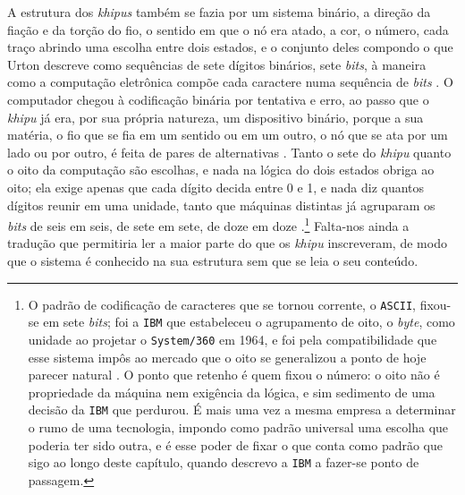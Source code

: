 A estrutura dos \textit{khipus} também se fazia por um sistema binário, a direção da fiação e da torção do fio, o sentido em que o nó era atado, a cor, o número, cada traço abrindo uma escolha entre dois estados, e o conjunto deles compondo o que Urton descreve como sequências de sete dígitos binários, sete \textit{bits}, à maneira como a computação eletrônica compõe cada caractere numa sequência de \textit{bits} \parencite[pp.~1--2, 109--117]{urton2003signs}. O computador chegou à codificação binária por tentativa e erro, ao passo que o \textit{khipu} já era, por sua própria natureza, um dispositivo binário, porque a sua matéria, o fio que se fia em um sentido ou em um outro, o nó que se ata por um lado ou por outro, é feita de pares de alternativas \parencite[p.~109]{urton2003signs}. Tanto o sete do \textit{khipu} quanto o oito da computação são escolhas, e nada na lógica do dois estados obriga ao oito; ela exige apenas que cada dígito decida entre 0 e 1, e nada diz quantos dígitos reunir em uma unidade, tanto que máquinas distintas já agruparam os \textit{bits} de seis em seis, de sete em sete, de doze em doze \parencite[pp.~115--117]{urton2003signs}.\footnote{O padrão de codificação de caracteres que se tornou corrente, o \texttt{ASCII}, fixou-se em sete \textit{bits}; foi a \texttt{IBM} que estabeleceu o agrupamento de oito, o \textit{byte}, como unidade ao projetar o \texttt{System/360} em 1964, e foi pela compatibilidade que esse sistema impôs ao mercado que o oito se generalizou a ponto de hoje parecer natural \parencite{Pugh1995Building, Cortada2019IBM}. O ponto que retenho é quem fixou o número: o oito não é propriedade da máquina nem exigência da lógica, e sim sedimento de uma decisão da \texttt{IBM} que perdurou. É mais uma vez a mesma empresa a determinar o rumo de uma tecnologia, impondo como padrão universal uma escolha que poderia ter sido outra, e é esse poder de fixar o que conta como padrão que sigo ao longo deste capítulo, quando descrevo a \texttt{IBM} a fazer-se ponto de passagem.} Falta-nos ainda a tradução que permitiria ler a maior parte do que os \textit{khipu} inscreveram, de modo que o sistema é conhecido na sua estrutura sem que se leia o seu conteúdo.

